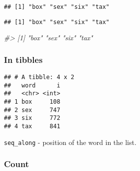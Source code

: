 \documentclass[
]{article}
\newenvironment{Shaded}{\begin{snugshade}}{\end{snugshade}}
\newcommand{\CommentTok}[1]{\textcolor[rgb]{0.56,0.35,0.01}{\textit{#1}}}
\newcommand{\DataTypeTok}[1]{\textcolor[rgb]{0.13,0.29,0.53}{#1}}
\newcommand{\KeywordTok}[1]{\textcolor[rgb]{0.13,0.29,0.53}{\textbf{#1}}}
\newcommand{\NormalTok}[1]{#1}
\newcommand{\OperatorTok}[1]{\textcolor[rgb]{0.81,0.36,0.00}{\textbf{#1}}}
\newcommand{\StringTok}[1]{\textcolor[rgb]{0.31,0.60,0.02}{#1}}
\begin{document}
\begin{verbatim}
## [1] "box" "sex" "six" "tax"
\end{verbatim}

\begin{Shaded}
\end{Shaded}

\begin{verbatim}
## [1] "box" "sex" "six" "tax"
\end{verbatim}

\begin{Shaded}
\begin{Highlighting}[]
\CommentTok{\#\textgreater{} [1] "box" "sex" "six" "tax"}
\end{Highlighting}
\end{Shaded}

\hypertarget{in-tibbles}{%
\subsubsection{In tibbles}\label{in-tibbles}}

\begin{Shaded}
\end{Shaded}

\begin{verbatim}
## # A tibble: 4 x 2
##   word      i
##   <chr> <int>
## 1 box     108
## 2 sex     747
## 3 six     772
## 4 tax     841
\end{verbatim}

\texttt{seq\_along} - position of the word in the list.

\hypertarget{count}{%
\subsubsection{Count}\label{count}}
\end{document}
